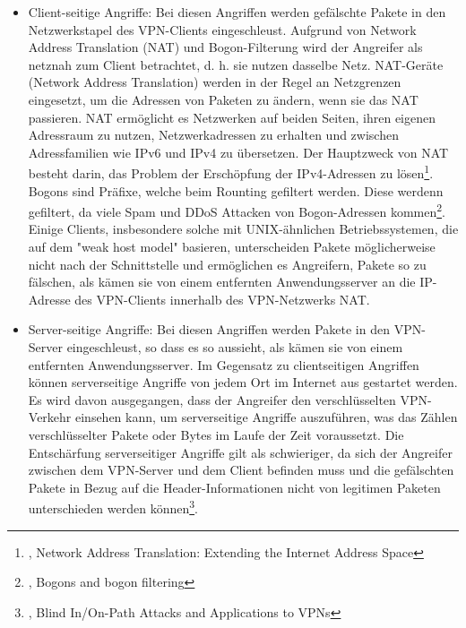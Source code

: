 \begin{itemize}
    \item Client-seitige Angriffe: Bei diesen Angriffen werden gefälschte Pakete in den Netzwerkstapel des VPN-Clients eingeschleust. Aufgrund von Network Address Translation (NAT) und Bogon-Filterung wird der Angreifer als netznah zum Client betrachtet, d. h. sie nutzen dasselbe Netz. NAT-Geräte (Network Address Translation) werden in der Regel an Netzgrenzen eingesetzt, um die Adressen von Paketen zu ändern, wenn sie das NAT passieren. NAT ermöglicht es Netzwerken auf beiden Seiten, ihren eigenen Adressraum zu nutzen, Netzwerkadressen zu erhalten und zwischen Adressfamilien wie IPv6 und IPv4 zu übersetzen. Der Hauptzweck von NAT besteht darin, das Problem der Erschöpfung der IPv4-Adressen zu lösen\footnote{\cite{NetworkAddressTranslation}, Network Address Translation: Extending the Internet Address Space}. Bogons sind Präfixe, welche beim Rounting gefiltert werden. Diese werdenn gefiltert, da viele Spam und DDoS Attacken von Bogon-Adressen kommen\footnote{\cite{BogonFiltering}, Bogons and bogon filtering}. Einige Clients, insbesondere solche mit UNIX-ähnlichen Betriebssystemen, die auf dem "weak host model" basieren, unterscheiden Pakete möglicherweise nicht nach der Schnittstelle und ermöglichen es Angreifern, Pakete so zu fälschen, als kämen sie von einem entfernten Anwendungsserver an die IP-Adresse des VPN-Clients innerhalb des VPN-Netzwerks NAT.
    \item Server-seitige Angriffe: Bei diesen Angriffen werden Pakete in den VPN-Server eingeschleust, so dass es so aussieht, als kämen sie von einem entfernten Anwendungsserver. Im Gegensatz zu clientseitigen Angriffen können serverseitige Angriffe von jedem Ort im Internet aus gestartet werden. Es wird davon ausgegangen, dass der Angreifer den verschlüsselten VPN-Verkehr einsehen kann, um serverseitige Angriffe auszuführen, was das Zählen verschlüsselter Pakete oder Bytes im Laufe der Zeit voraussetzt. Die Entschärfung serverseitiger Angriffe gilt als schwieriger, da sich der Angreifer zwischen dem VPN-Server und dem Client befinden muss und die gefälschten Pakete in Bezug auf die Header-Informationen nicht von legitimen Paketen unterschieden werden können\footnote{\cite{AttacksOnVPNs}, Blind In/On-Path Attacks and Applications to VPNs}.
\end{itemize}
